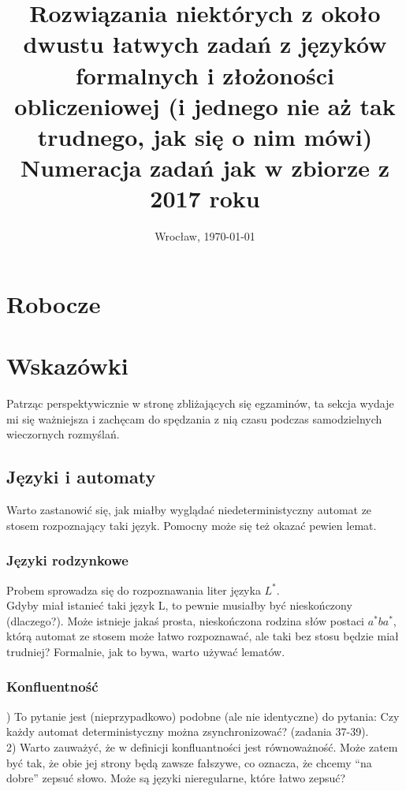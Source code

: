 \documentclass[a4paper,11pt]{article}
\date{Wrocław, \today}
\title{\LARGE{\textbf{Rozwiązania niektórych z około dwustu łatwych zadań z języków formalnych i złożoności obliczeniowej 
(i jednego nie aż tak trudnego, jak się o nim mówi)}\\\Large{Numeracja zadań jak w zbiorze z 2017 roku}}}
\author{}
\newenvironment{zadanie}[1]
  {\renewcommand\theinnercustomthm{#1}\innercustomthm}
  {\endinnercustomthm}
\begin{document}
\maketitle

\section{Robocze}


\section{Wskazówki}

Patrząc perspektywicznie w stronę zbliżających się egzaminów, ta sekcja wydaje mi się ważniejsza i zachęcam do spędzania z nią
czasu podczas samodzielnych wieczornych rozmyślań.

\subsection{Języki i automaty}

\begin{zadanie}{63}
Warto zastanowić się, jak miałby wyglądać niedeterministyczny automat ze stosem rozpoznający taki język. Pomocny może się też
okazać pewien lemat.
\end{zadanie}

\subsubsection{Języki rodzynkowe}

\begin{zadanie}{71}
Probem sprowadza się do rozpoznawania liter języka $L^*$. \\
Gdyby miał istanieć taki język L, to pewnie musiałby być nieskończony (dlaczego?). Może istnieje jakaś prosta, nieskończona
rodzina słów postaci $a^*ba^*$, którą automat ze stosem może łatwo rozpoznawać, ale taki bez stosu będzie miał trudniej?
Formalnie, jak to bywa, warto używać lematów.
\end{zadanie}

\subsubsection{Konfluentność}

\begin{zadanie}{74}
1) To pytanie jest (nieprzypadkowo) podobne (ale nie identyczne) do pytania: Czy każdy automat deterministyczny można 
zsynchronizować? (zadania 37-39). \\
2) Warto zauważyć, że w definicji konfluantności jest równoważność. Może zatem być tak, że obie jej strony będą zawsze fałszywe,
co oznacza, że chcemy ``na dobre'' zepsuć słowo. Może są języki nieregularne, które łatwo zepsuć?
\end{zadanie}
\end{document}
